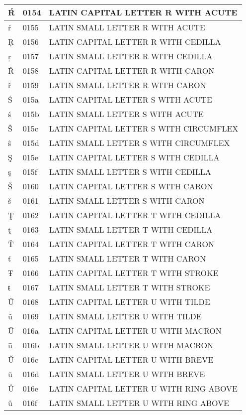 \documentclass[12pt,letterpaper,openany]{book}
\begin{document}
\begin{center}
\begin{supertabular}{|m{0.25in}|m{0.5in}|m{4in}|}
Ŕ & 0154 & LATIN CAPITAL LETTER R WITH ACUTE\\\hline
ŕ & 0155 & LATIN SMALL LETTER R WITH ACUTE\\\hline
Ŗ & 0156 & LATIN CAPITAL LETTER R WITH CEDILLA\\\hline
ŗ & 0157 & LATIN SMALL LETTER R WITH CEDILLA\\\hline
Ř & 0158 & LATIN CAPITAL LETTER R WITH CARON\\\hline
ř & 0159 & LATIN SMALL LETTER R WITH CARON\\\hline
Ś & 015a & LATIN CAPITAL LETTER S WITH ACUTE\\\hline
ś & 015b & LATIN SMALL LETTER S WITH ACUTE\\\hline
Ŝ & 015c & LATIN CAPITAL LETTER S WITH CIRCUMFLEX\\\hline
ŝ & 015d & LATIN SMALL LETTER S WITH CIRCUMFLEX\\\hline
Ş & 015e & LATIN CAPITAL LETTER S WITH CEDILLA\\\hline
ş & 015f & LATIN SMALL LETTER S WITH CEDILLA\\\hline
Š & 0160 & LATIN CAPITAL LETTER S WITH CARON\\\hline
š & 0161 & LATIN SMALL LETTER S WITH CARON\\\hline
Ţ & 0162 & LATIN CAPITAL LETTER T WITH CEDILLA\\\hline
ţ & 0163 & LATIN SMALL LETTER T WITH CEDILLA\\\hline
Ť & 0164 & LATIN CAPITAL LETTER T WITH CARON\\\hline
ť & 0165 & LATIN SMALL LETTER T WITH CARON\\\hline
Ŧ & 0166 & LATIN CAPITAL LETTER T WITH STROKE\\\hline
ŧ & 0167 & LATIN SMALL LETTER T WITH STROKE\\\hline
Ũ & 0168 & LATIN CAPITAL LETTER U WITH TILDE\\\hline
ũ & 0169 & LATIN SMALL LETTER U WITH TILDE\\\hline
Ū & 016a & LATIN CAPITAL LETTER U WITH MACRON\\\hline
ū & 016b & LATIN SMALL LETTER U WITH MACRON\\\hline
Ŭ & 016c & LATIN CAPITAL LETTER U WITH BREVE\\\hline
ŭ & 016d & LATIN SMALL LETTER U WITH BREVE\\\hline
Ů & 016e & LATIN CAPITAL LETTER U WITH RING ABOVE\\\hline
ů & 016f & LATIN SMALL LETTER U WITH RING ABOVE\\\hline

\end{supertabular}
\end{center}
\end{document}
